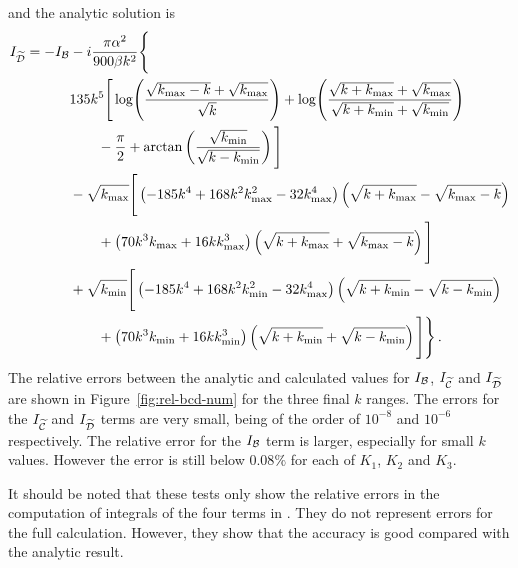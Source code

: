 and the analytic solution is
% 
\begin{align}
\label{eq:dint-soln-num}
I_{\wt{\D}} = -I_\B &-i\frac{\pi\alpha^2}{900\beta k^2}\Bigg\{ \nonumber \\
	&135 k^5 \Bigg[ \log\Biggl(\frac{\sqrt{\kmax-k} + \sqrt{\kmax}}{\sqrt{k}}
			    \Biggr)
	 + \log\Biggl( \frac{\sqrt{k+\kmax} +\sqrt{\kmax}}{\sqrt{k+\kmin} +
			  \sqrt{\kmin}}\Biggr) \nonumber \\
	&\qquad -\frac{\pi}{2} + \arctan\left(
\frac{\sqrt{\kmin}}{\sqrt{k-\kmin}}\right)
	\Bigg] \nonumber\\
% 
        &-\sqrt{\kmax}\Bigg[ \left(-185k^4 + 168k^2\kmax^2-32\kmax^4
	    \right)\left(\sqrt{k+\kmax} - \sqrt{\kmax-k}\right) \nonumber \\
	&\qquad +\left(70k^3\kmax +16k\kmax^3\right) \left(\sqrt{k+\kmax} +
         \sqrt{\kmax -k} \right) \Bigg] \nonumber \\
% 
	&+\sqrt{\kmin}\Bigg[ \left(-185k^4 + 168k^2\kmin^2 -32\kmax^4
	    \right)\left(\sqrt{k+\kmin} - \sqrt{k-\kmin}\right) \nonumber \\
	&\qquad +\left(70k^3\kmin +16k\kmin^3\right) \left(\sqrt{k+\kmin} +
         \sqrt{k-\kmin} \right) \Bigg] \Bigg\} \,.
\end{align}
% 
The relative errors between the analytic and calculated values for $I_{\mathcal{B}}$,
$I_{\widetilde{\mathcal{C}}}$ and $I_{\widetilde{\mathcal{D}}}$ are shown in Figure~\ref{fig:rel-bcd-num} for the
three final $k$ ranges. The errors
for the $I_{\widetilde{\mathcal{C}}}$ and $I_{\widetilde{\mathcal{D}}}$ terms are very small, being of the order of
$10^{-8}$ and $10^{-6}$ respectively. The relative error for the $I_{\mathcal{B}}$ term is
larger, especially for small $k$ values. However the error is still below $0.08\%$
for each of $K_1$, $K_2$ and $K_3$.


It should be noted that these tests only show the relative errors in the
computation of integrals of the four terms in . They
do not represent
errors for the full calculation. However, they show that the accuracy is good
compared with the analytic result. 

